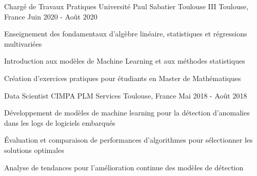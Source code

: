 \begin{cventries}

\cventry
{Chargé de Travaux Pratiques} %
{Université Paul Sabatier Toulouse III} %
{Toulouse, France} %
{Juin 2020 - Août 2020} %
{ %
\begin{cvitems}
\item {Enseignement des fondamentaux d'algèbre linéaire, statistiques et régressions multivariées}
\item {Introduction aux modèles de Machine Learning et aux méthodes statistiques}
\item {Création d'exercices pratiques pour étudiants en Master de Mathématiques}
\end{cvitems}
}
\vspace{1.5em}


\cventry
{Data Scientist} %
{CIMPA PLM Services} %
{Toulouse, France} %
{Mai 2018 - Août 2018} %
{ %
\begin{cvitems}
\item {Développement de modèles de machine learning pour la détection d'anomalies dans les logs de logiciels embarqués}
\item {Évaluation et comparaison de performances d'algorithmes pour sélectionner les solutions optimales}
\item {Analyse de tendances pour l'amélioration continue des modèles de détection}
\end{cvitems}
}


\end{cventries}

